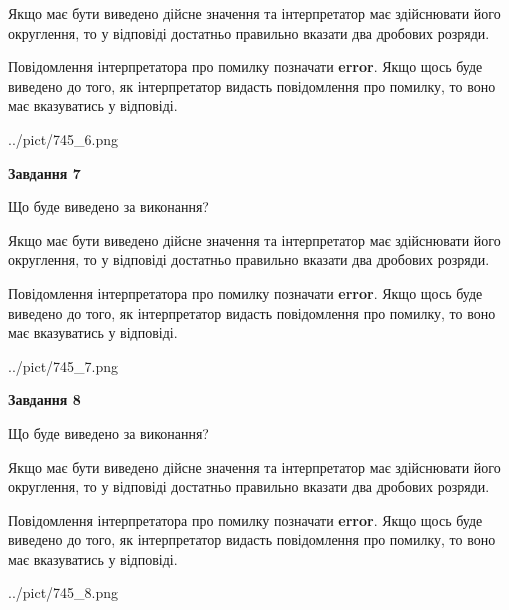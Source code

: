\documentclass[12pt, ukrainian]{article}
\begin{document}
{\begin {Large}
Якщо має бути виведено дійсне значення та інтерпретатор має здійснювати його округлення, 
то у відповіді достатньо правильно вказати два дробових розряди.

Повідомлення інтерпретатора про помилку позначати \textbf{error}.
Якщо щось буде виведено до того, як інтерпретатор видасть повідомлення про помилку, 
то воно має вказуватись у відповіді. \par

\begin{center}
	{../pict/745_6.png}
\end{center}
\newpage

{\begin {center}\textbf{Завдання 7}\end {center}}\par
Що буде виведено за виконання? \par

Якщо має бути виведено дійсне значення та інтерпретатор має здійснювати його округлення, 
то у відповіді достатньо правильно вказати два дробових розряди.

Повідомлення інтерпретатора про помилку позначати \textbf{error}.
Якщо щось буде виведено до того, як інтерпретатор видасть повідомлення про помилку, 
то воно має вказуватись у відповіді. \par

\begin{center}
	{../pict/745_7.png}
\end{center}
\newpage

{\begin {center}\textbf{Завдання 8}\end {center}}\par
Що буде виведено за виконання? \par

Якщо має бути виведено дійсне значення та інтерпретатор має здійснювати його округлення, 
то у відповіді достатньо правильно вказати два дробових розряди.

Повідомлення інтерпретатора про помилку позначати \textbf{error}.
Якщо щось буде виведено до того, як інтерпретатор видасть повідомлення про помилку, 
то воно має вказуватись у відповіді. \par

\begin{center}
	{../pict/745_8.png}
\end{center}
\newpage


\end{Large}}
\end{document}
